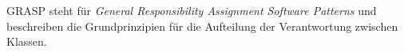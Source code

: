 GRASP steht für \textit{General Responsibility Assignment Software Patterns} und beschreiben 
die Grundprinzipien für die Aufteilung der Verantwortung zwischen Klassen. \cite{GRASP_Def}